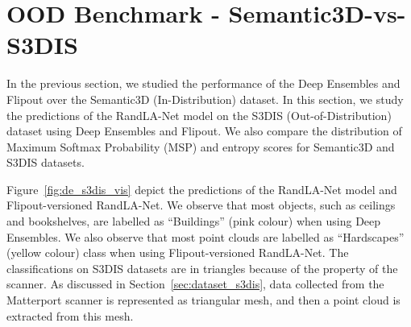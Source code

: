     \section{OOD Benchmark - Semantic3D-vs-S3DIS}
    In the previous section, we studied the performance of the Deep Ensembles and Flipout over the Semantic3D (In-Distribution) dataset.
    In this section, we study the predictions of the RandLA-Net model on the S3DIS (Out-of-Distribution) dataset using Deep Ensembles and Flipout.
    We also compare the distribution of Maximum Softmax Probability (MSP) and entropy scores for Semantic3D and S3DIS datasets.

    Figure~\ref{fig:de_s3dis_vis} depict the predictions of the RandLA-Net model and Flipout-versioned RandLA-Net.
    We observe that most objects, such as ceilings and bookshelves, are labelled as ``Buildings'' (pink colour) when using Deep Ensembles.
    We also observe that most point clouds are labelled as ``Hardscapes'' (yellow colour) class when using Flipout-versioned RandLA-Net.
    The classifications on S3DIS datasets are in triangles because of the property of the scanner.
    As discussed in Section~\ref{sec:dataset_s3dis}, data collected from the Matterport scanner is represented as triangular mesh, and then a point cloud is extracted from this mesh.

